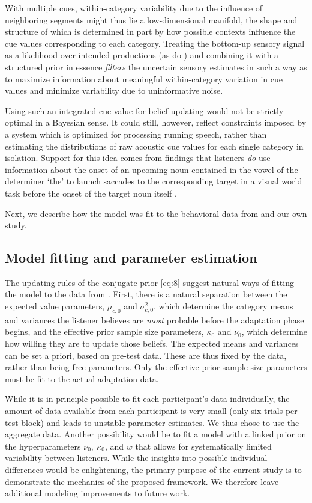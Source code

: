 With multiple cues, within-category variability due to the influence of neighboring segments might thus lie a low-dimensional manifold, the shape and structure of which is determined in part by how possible contexts influence the cue values corresponding to each category.  Treating the bottom-up sensory signal as a likelihood over intended productions (as do ) and combining it with a structured prior in essence \emph{filters} the uncertain sensory estimates in such a way as to maximize information about meaningful within-category variation in cue values and minimize variability due to uninformative noise.

Using such an integrated cue value for belief updating would not be strictly optimal in a Bayesian sense. It could still, however, reflect constraints imposed by a system which is optimized for processing running speech, rather than estimating the distributions of raw acoustic cue values for each single category in isolation. Support for this idea comes from findings that listeners \emph{do} use information about the onset of an upcoming noun contained in the vowel of the determiner `the' to launch saccades to the corresponding target in a visual world task before the onset of the target noun itself \cite{Salverda2014}.

Next, we describe how the model was fit to the behavioral data from  and our own study.


\subsection{Model fitting and parameter estimation}
\label{sec:model-fitt-param}

The updating rules of the conjugate prior \eqref{eq:8} suggest natural ways of fitting the model to the data from .  First, there is a natural separation between the expected value parameters, $\mu_{c,0}$ and $\sigma^2_{c,0}$, which determine the category means and variances the listener believes are \emph{most} probable before the adaptation phase begins, and the effective prior sample size parameters, $\kappa_0$ and $\nu_0$, which determine how willing they are to update those beliefs.  The expected means and variances can be set a priori, based on pre-test data.  These are thus fixed by the data, rather than being free parameters.  Only the effective prior sample size parameters must be fit to the actual adaptation data.

While it is in principle possible to fit each participant's data individually, the amount of data available from each participant is very small (only six trials per test block) and leads to unstable parameter estimates. We thus chose to use the aggregate data.  Another possibility would be to fit a model with a linked prior on the hyperparameters $\nu_0,\ \kappa_0$, and $w$ that allows for systematically limited variability between listeners. While the insights into possible individual differences would be enlightening, the primary purpose of the current study is to demonstrate the mechanics of the proposed framework. We therefore leave additional modeling improvements to future work.


